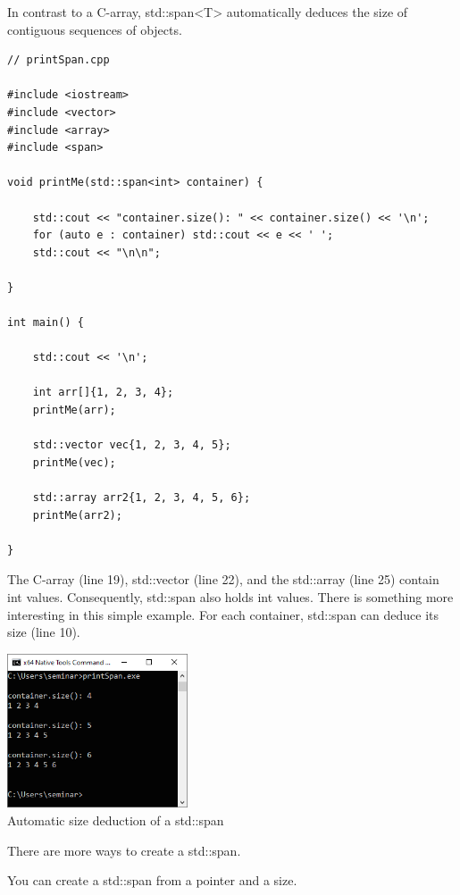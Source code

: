In contrast to a C-array, std::span<T> automatically deduces the size of contiguous sequences of objects.

\begin{lstlisting}[style=styleCXX]
// printSpan.cpp

#include <iostream>
#include <vector>
#include <array>
#include <span>

void printMe(std::span<int> container) {

	std::cout << "container.size(): " << container.size() << '\n';
	for (auto e : container) std::cout << e << ' ';
	std::cout << "\n\n";
	
}

int main() {

	std::cout << '\n';
	
	int arr[]{1, 2, 3, 4};
	printMe(arr);
	
	std::vector vec{1, 2, 3, 4, 5};
	printMe(vec);
	
	std::array arr2{1, 2, 3, 4, 5, 6};
	printMe(arr2);

}
\end{lstlisting}

The C-array (line 19), std::vector (line 22), and the std::array (line 25) contain int values. Consequently, std::span also holds int values. There is something more interesting in this simple example. For each container, std::span can deduce its size (line 10).

\begin{center}
\includegraphics[width=0.4\textwidth]{content/3/chapter5/images/5.png}\\
Automatic size deduction of a std::span
\end{center}

There are more ways to create a std::span.



You can create a std::span from a pointer and a size.

